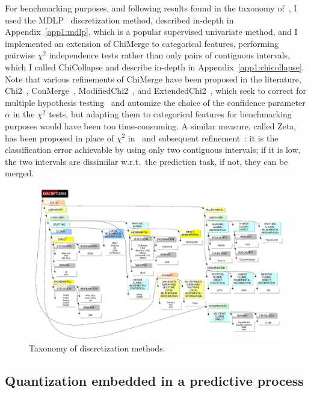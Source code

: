 For benchmarking purposes, and following results found in the taxonomy of~\cite{ramirez2016data}, I used the MDLP~\cite{fayyad1993multi} discretization method, described in-depth in Appendix~\ref{app1:mdlp}, which is a popular supervised univariate method, and I implemented an extension of ChiMerge to categorical features, performing pairwise $\chi^2$ independence tests rather than only pairs of contiguous intervals, which I called ChiCollapse and describe in-depth in Appendix~\ref{app1:chicollapse}. Note that various refinements of ChiMerge have been proposed in the literature, Chi2~\cite{liu1995chi2}, ConMerge~\cite{wang1998concurrent}, ModifiedChi2~\cite{tay2002modified}, and ExtendedChi2~\cite{su2005extended}, which seek to correct for multiple hypothesis testing~\cite{shaffer1995multiple} and automize the choice of the confidence parameter $\alpha$ in the $\chi^2$ tests, but adapting them to categorical features for benchmarking purposes would have been too time-consuming. A similar measure, called Zeta, has been proposed in place of $\chi^2$ in~\cite{ho1997zeta} and subsequent refinement~\cite{ho1998efficient}: it is the classification error achievable by using only two contiguous intervals; if it is low, the two intervals are dissimilar w.r.t.\ the prediction task, if not, they can be merged.

\begin{figure}[!ht]
\includegraphics[width=\textwidth]{figures/chapitre4/taxonomy.PNG}
\caption{Taxonomy of discretization methods.}
\label{fig:taxonomy}
\end{figure}



\subsection{Quantization embedded in a predictive process}


